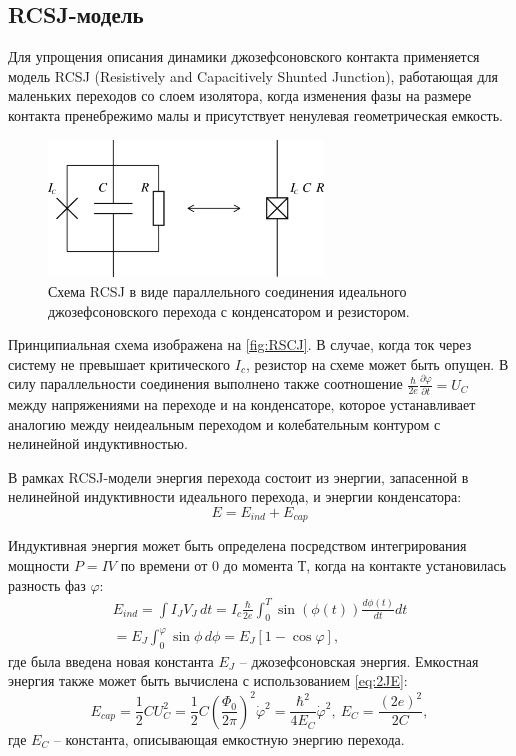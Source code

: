 \documentclass[12pt, twoside]{report}
\numberwithin{equation}{section}
\numberwithin{figure}{section}
\begin{document}
\subsection{RCSJ-модель}
Для упрощения описания динамики джозефсоновского контакта применяется модель RCSJ (Resistively and Capacitively Shunted Junction), работающая для маленьких переходов со слоем изолятора, когда изменения фазы на размере контакта пренебрежимо малы и присутствует ненулевая геометрическая емкость. 
\begin{figure}[h]
\centering
\includegraphics[width=0.65\textwidth]{Pictures/RCSJ.png}
\caption{Схема RCSJ в виде параллельного соединения идеального джозефсоновского перехода с конденсатором и резистором.}
\label{fig:RSCJ}
\end{figure}

Принципиальная схема изображена на \autoref{fig:RSCJ}. В случае, когда ток через систему не превышает критического $I_c$, резистор на схеме может быть опущен. В силу параллельности соединения выполнено также соотношение $\frac{\hbar}{2e}\frac{\partial\varphi}{\partial t} = U_C$ между напряжениями на переходе и на конденсаторе, которое устанавливает аналогию между неидеальным переходом и колебательным контуром с нелинейной индуктивностью.

В рамках RCSJ-модели энергия перехода состоит из энергии, запасенной в нелинейной индуктивности идеального перехода, и энергии конденсатора:
\begin{equation}
E = E_{ind}+E_{cap}  \label{eq:JJenrj1}
\end{equation}

Индуктивная энергия может быть определена посредством интегрирования мощности $P = IV$ по времени от 0 до момента Т, когда на контакте установилась разность фаз $\varphi$:
\begin{equation}
\begin{gathered}
E_{ind} = \int I_JV_J\, dt = I_c \frac{\hbar}{2e}\int_0^T \sin(\phi(t))\frac{d\phi(t)}{dt}dt  \\ 
= E_J \int_0^\varphi \sin\phi\, d\phi = E_J [1-\cos\varphi],
\end{gathered}
\end{equation}
где была введена новая константа $E_J$ -- джозефсоновская энергия. Емкостная энергия также может быть вычислена с использованием \eqref{eq:2JE}:
\begin{equation}
E_{cap} = \frac{1}{2}C U_C^2 = \frac{1}{2} C \left(\frac{\Phi_0}{2\pi}\right)^2 \dot \varphi^2 = 
\frac{\hbar^2}{4E_C} \dot \varphi^2,\ E_C = \frac{(2e)^2}{2C},
\label{eq:JJenrj2}
\end{equation}
где $E_C$ -- константа, описывающая емкостную энергию перехода.
\end{document}
